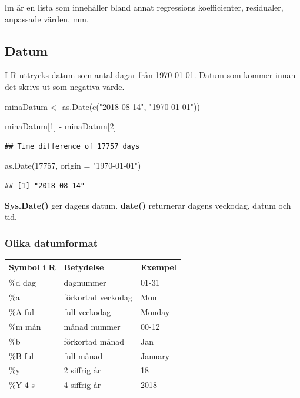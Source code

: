 \documentclass[
]{book}
\newenvironment{Shaded}{\begin{snugshade}}{\end{snugshade}}
\newcommand{\AttributeTok}[1]{\textcolor[rgb]{0.77,0.63,0.00}{#1}}
\newcommand{\DecValTok}[1]{\textcolor[rgb]{0.00,0.00,0.81}{#1}}
\newcommand{\FunctionTok}[1]{\textcolor[rgb]{0.00,0.00,0.00}{#1}}
\newcommand{\NormalTok}[1]{#1}
\newcommand{\OtherTok}[1]{\textcolor[rgb]{0.56,0.35,0.01}{#1}}
\newcommand{\SpecialCharTok}[1]{\textcolor[rgb]{0.00,0.00,0.00}{#1}}
\newcommand{\StringTok}[1]{\textcolor[rgb]{0.31,0.60,0.02}{#1}}
\begin{document}
lm är en lista som innehåller bland annat regressions koefficienter, residualer, anpassade värden, mm.

\hypertarget{datum}{%
\subsection{Datum}\label{datum}}

I R uttrycks datum som antal dagar från 1970-01-01. Datum som kommer innan det skrivs ut som negativa värde.

\begin{Shaded}
\begin{Highlighting}[]
\NormalTok{minaDatum }\OtherTok{\textless{}{-}} \FunctionTok{as.Date}\NormalTok{(}\FunctionTok{c}\NormalTok{(}\StringTok{"2018{-}08{-}14"}\NormalTok{, }\StringTok{"1970{-}01{-}01"}\NormalTok{))}

\NormalTok{minaDatum[}\DecValTok{1}\NormalTok{] }\SpecialCharTok{{-}}\NormalTok{ minaDatum[}\DecValTok{2}\NormalTok{]}
\end{Highlighting}
\end{Shaded}

\begin{verbatim}
## Time difference of 17757 days
\end{verbatim}

\begin{Shaded}
\begin{Highlighting}[]
\FunctionTok{as.Date}\NormalTok{(}\DecValTok{17757}\NormalTok{, }\AttributeTok{origin =} \StringTok{"1970{-}01{-}01"}\NormalTok{)}
\end{Highlighting}
\end{Shaded}

\begin{verbatim}
## [1] "2018-08-14"
\end{verbatim}

\textbf{Sys.Date()} ger dagens datum.
\textbf{date()} returnerar dagens veckodag, datum och tid.

\hypertarget{olika-datumformat}{%
\subsubsection{Olika datumformat}\label{olika-datumformat}}

\begin{longtable}[]{@{}lll@{}}
\toprule
Symbol i R & Betydelse & Exempel\tabularnewline
\midrule
\endhead
\%d \textbar{} dag & dagnummer & 01-31\tabularnewline
\%a & förkortad veckodag & Mon\tabularnewline
\%A \textbar{} ful & full veckodag & Monday\tabularnewline
\%m \textbar{} mån & månad nummer & 00-12\tabularnewline
\%b & förkortad månad & Jan\tabularnewline
\%B \textbar{} ful & full månad & January\tabularnewline
\%y & 2 siffrig år & 18\tabularnewline
\%Y \textbar{} 4 s & 4 siffrig år & 2018\tabularnewline
\bottomrule
\end{longtable}
\end{document}
